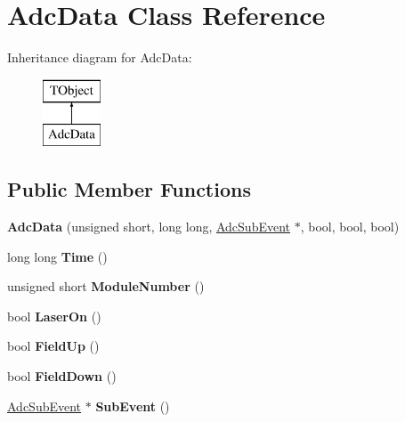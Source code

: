 \hypertarget{class_adc_data}{}\section{Adc\+Data Class Reference}
\label{class_adc_data}
Inheritance diagram for Adc\+Data\+:\begin{figure}[H]
\begin{center}
\leavevmode
\includegraphics[height=2.000000cm]{class_adc_data}
\end{center}
\end{figure}
\subsection*{Public Member Functions}
\begin{DoxyCompactItemize}
\item 
\mbox{\label{class_adc_data_a5523e3692fafaf035369a6b8c991df98}} 
{\bfseries Adc\+Data} (unsigned short, long long, \hyperlink{class_adc_sub_event}{Adc\+Sub\+Event} $\ast$, bool, bool, bool)
\item 
\mbox{\label{class_adc_data_a2729314d57d17125c0055f7475c43c84}} 
long long {\bfseries Time} ()
\item 
\mbox{\label{class_adc_data_a026e4922b857c1015e52ecc53dc0a190}} 
unsigned short {\bfseries Module\+Number} ()
\item 
\mbox{\label{class_adc_data_a92ec46fe660d0e0bc3153fb736dd297d}} 
bool {\bfseries Laser\+On} ()
\item 
\mbox{\label{class_adc_data_a94785461bc83a0e6ae78d70945bf36b3}} 
bool {\bfseries Field\+Up} ()
\item 
\mbox{\label{class_adc_data_a5ae609c669e0259a68c786bef783fcd7}} 
bool {\bfseries Field\+Down} ()
\item 
\mbox{\label{class_adc_data_a059797e6f3b3d6e65c3ee78d5b6cd3d8}} 
\hyperlink{class_adc_sub_event}{Adc\+Sub\+Event} $\ast$ {\bfseries Sub\+Event} ()
\end{DoxyCompactItemize}
